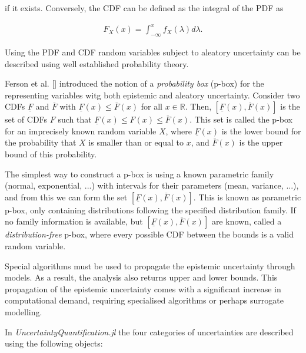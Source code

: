 if it exists. Conversely, the CDF can be defined as the integral of the PDF as



\begin{equation*}
\begin{split}    F_X(x) = \int_{-\infty}^x f_X(\lambda) d\lambda.\end{split}\end{equation*}


Using the PDF and CDF random variables subject to aleatory uncertainty can be described using well established probability theory.



Ferson et al. [] introduced the notion of a \emph{probability box} (p-box) for the representing variables witg both epistemic and aleatory uncertainty. Consider two CDFs \(\underline{F}\) and \(\overline{F}\) with \(\underline{F}(x) \leq \overline{F}(x)\) for all \(x \in \mathbb{R}\). Then, \([\underline{F}(x), \overline{F}(x)]\) is the set of CDFs \(F\) such that \(\underline{F}(x) \leq F(x) \leq \overline{F}(x)\). This set is called the p-box for an imprecisely known random variable \(X\), where \(\underline{F}(x)\) is the lower bound for the probability that \(X\) is smaller than or equal to \(x\), and \(\overline{F}(x)\) is the upper bound of this probability.



The simplest way to construct a p-box is using a known parametric family (normal, exponential, ...) with intervals for their parameters (mean, variance, ...), and from this we can form the set \([\underline{F}(x), \overline{F}(x)]\). This is known as parametric p-box, only containing distributions following the specified distribution family. If no family information is available, but \([\underline{F}(x), \overline{F}(x)]\) are known, called a \emph{distribution-free} p-box, where every possible CDF between the bounds is a valid random variable.



Special algorithms must be used to propagate the epistemic uncertainty through models. As a result, the analysis also returns upper and lower bounds. This propagation of the epistemic uncertainty comes with a significant increase in computational demand, requiring specialised algorithms or perhaps surrogate modelling.



In \emph{UncertaintyQuantification.jl} the four categories of uncertainties are described using the following objects:



